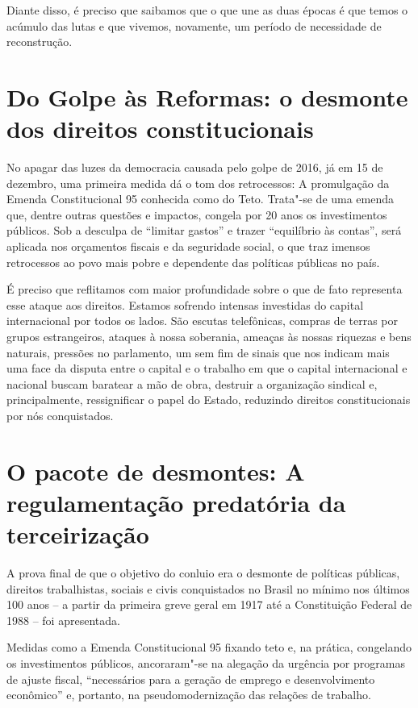 Diante disso, é preciso que saibamos que o que une as duas épocas é que
temos o acúmulo das lutas e que vivemos, novamente, um período de
necessidade de reconstrução.

\section{Do Golpe às Reformas: o desmonte dos direitos constitucionais}

No apagar das luzes da democracia causada pelo golpe de 2016, já em 15
de dezembro, uma primeira medida dá o tom dos retrocessos: A promulgação
da Emenda Constitucional 95 conhecida como  do Teto. Trata"-se de uma
emenda que, dentre outras questões e impactos, congela por 20 anos os
investimentos públicos. Sob a desculpa de ``limitar gastos'' e trazer
``equilíbrio às contas'', será aplicada nos orçamentos fiscais e da
seguridade social, o que traz imensos retrocessos ao povo mais pobre e
dependente das políticas públicas no país.

É preciso que reflitamos com maior profundidade sobre o que de fato representa
esse ataque aos direitos. Estamos sofrendo intensas investidas do
capital internacional por todos os lados. São escutas telefônicas,
compras de terras por grupos estrangeiros, ataques à nossa soberania,
ameaças às nossas riquezas e bens naturais, pressões no parlamento, um
sem fim de sinais que nos indicam mais uma face da disputa entre o
capital e o trabalho em que o capital internacional e nacional buscam
baratear a mão de obra, destruir a organização sindical e,
principalmente, ressignificar o papel do Estado, reduzindo direitos
constitucionais por nós conquistados.

\section{O pacote de desmontes: A regulamentação predatória da
terceirização}

A prova final de que o objetivo do conluio era o desmonte de políticas
públicas, direitos trabalhistas, sociais e civis conquistados no Brasil
no mínimo nos últimos 100 anos -- a partir da primeira greve geral em
1917 até a Constituição Federal de 1988 -- foi apresentada.

Medidas como a Emenda Constitucional 95 fixando teto e, na prática,
congelando os investimentos públicos, ancoraram"-se na alegação da
urgência por programas de ajuste fiscal, ``necessários para a geração de
emprego e desenvolvimento econômico'' e, portanto, na pseudomodernização
das relações de trabalho.

